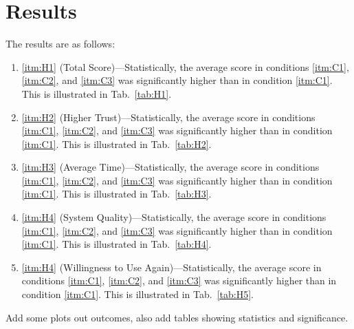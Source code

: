 \section{Results} \label{sec:results}
The results are as follows:

\begin{enumerate}
    \item \ref{itm:H1} (Total Score)---Statistically, the average score in conditions \ref{itm:C1}, \ref{itm:C2}, and \ref{itm:C3} was significantly higher than in condition \ref{itm:C1}. This is illustrated in Tab.~\ref{tab:H1}.
    \item \ref{itm:H2} (Higher Trust)---Statistically, the average score in conditions \ref{itm:C1}, \ref{itm:C2}, and \ref{itm:C3} was significantly higher than in condition \ref{itm:C1}. This is illustrated in Tab.~\ref{tab:H2}.
    \item \ref{itm:H3} (Average Time)---Statistically, the average score in conditions \ref{itm:C1}, \ref{itm:C2}, and \ref{itm:C3} was significantly higher than in condition \ref{itm:C1}. This is illustrated in Tab.~\ref{tab:H3}.
    \item \ref{itm:H4} (System Quality)---Statistically, the average score in conditions \ref{itm:C1}, \ref{itm:C2}, and \ref{itm:C3} was significantly higher than in condition \ref{itm:C1}. This is illustrated in Tab.~\ref{tab:H4}.
    \item \ref{itm:H4} (Willingness to Use Again)---Statistically, the average score in conditions \ref{itm:C1}, \ref{itm:C2}, and \ref{itm:C3} was significantly higher than in condition \ref{itm:C1}. This is illustrated in Tab.~\ref{tab:H5}.
\end{enumerate}

Add some plots out outcomes, also add tables showing statistics and significance.

